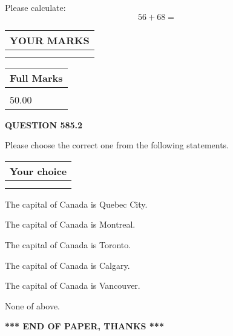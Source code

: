 \documentclass[12pt]{article}
\begin{document}
  
 
Please calculate:
\begin{equation}
56 +  %
68 = \nonumber
\end{equation}
 

 

 
  
\vspace{0.2in}
  
\noindent\begin{tabular}{|l|}
\hline
 YOUR MARKS  \\
\hline
 \\ 
 \\ 
\hline
\end{tabular}
\hspace{0.05in} \begin{tabular}{|l|}
\hline
 Full Marks  \\
\hline
 \\ 
50.00 \\
\hline
\end{tabular}
{\textbf{\Large{QUESTION
585.2 
}}}
  
  
Please choose the correct one from the following statements.
  
  
\noindent\hspace{3.0in} \begin{tabular}{|l|}
\hline
Your choice \\
\hline
 \\ 
 \\ 
\hline
\end{tabular}
  
  
 
 
The capital of Canada is Quebec City.
 
 
The capital of Canada is Montreal.
 
 
The capital of Canada is Toronto.
 
 
The capital of Canada is Calgary.
 
 
The capital of Canada is Vancouver.
 
 
 None of above.
 
 
   
   
 \vspace{0.2in}
 
   
   
   
   
\vspace{1.0in} 
{\textbf{\large{ *** END OF PAPER, THANKS *** }}} 
   
\end{document}
